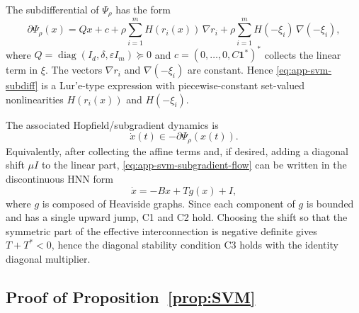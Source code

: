 \documentclass[journal]{IEEEtran}
\theoremstyle{myplain}
\begin{document}
The subdifferential of \(\Psi_\rho\) has the form
\begin{equation}\label{eq:app-svm-subdiff}
  \partial \Psi_\rho(x)
  =
  Qx+c
  +\rho\sum_{i=1}^m H(r_i(x))\,\nabla r_i
  +\rho\sum_{i=1}^m H(-\xi_i)\,\nabla(-\xi_i),
\end{equation}
where \(Q=\operatorname{diag}(I_d,\delta,\varepsilon I_m)\succeq 0\) and
\(c=(0,\dots,0,C\mathbf 1^*)^*\) collects the linear term in \(\xi\).
The vectors \(\nabla r_i\) and \(\nabla(-\xi_i)\) are constant. Hence
\eqref{eq:app-svm-subdiff} is a Lur'e-type expression with piecewise-constant
set-valued nonlinearities \(H(r_i(x))\) and \(H(-\xi_i)\).

The associated Hopfield/subgradient dynamics is
\begin{equation}\label{eq:app-svm-subgradient-flow}
  \dot x(t)\in -\partial\Psi_\rho(x(t)).
\end{equation}
Equivalently, after collecting the affine terms and, if desired, adding a
diagonal shift \(\mu I\) to the linear part, \eqref{eq:app-svm-subgradient-flow}
can be written in the discontinuous HNN form
\[
  \dot x=-Bx+Tg(x)+I,
\]
where \(g\) is composed of Heaviside graphs. Since each component of \(g\) is
bounded and has a single upward jump, C1 and C2 hold. Choosing the shift so that
the symmetric part of the effective interconnection is negative definite gives
\(T+T^*<0\), hence the diagonal stability condition C3 holds with the identity
diagonal multiplier.

\subsection{Proof of Proposition~\ref{prop:SVM}}
\end{document}
